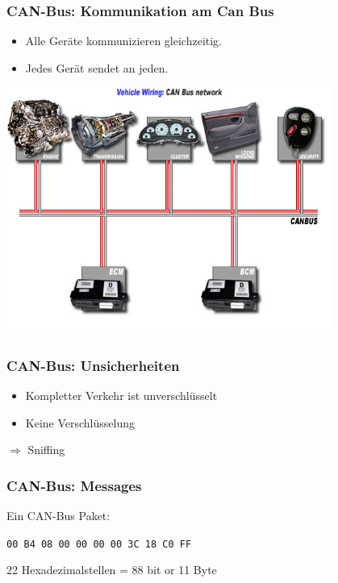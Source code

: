 \documentclass[t]{beamer}
\begin{document}
\begin{frame}
	\frametitle{CAN-Bus: Kommunikation am Can Bus}
	\begin{itemize}
        \item Alle Geräte kommunizieren gleichzeitig.
		\item Jedes Gerät sendet an jeden.
	\end{itemize}

    \begin{center}
        \includegraphics[width=0.8\textwidth]{pic/diag_canbus2.jpg} \ \
    \end{center}
\end{frame}

\begin{frame}
	\frametitle{CAN-Bus: Unsicherheiten}
	\begin{itemize}
        \item Kompletter Verkehr ist unverschlüsselt
		\item Keine Verschlüsselung
	\end{itemize}
    $\Rightarrow$ Sniffing
\end{frame}

\begin{frame}
	\frametitle{CAN-Bus: Messages}
    Ein CAN-Bus Paket:
    \newline
    \newline
    \newline
    \newline
    {\Large \centerline{\texttt{00 B4 08 00 00 00 00 3C 18 C0 FF}}}
    \vspace*{1cm}

    22 Hexadezimalstellen = 88 bit or 11 Byte
\end{frame}
\end{document}
